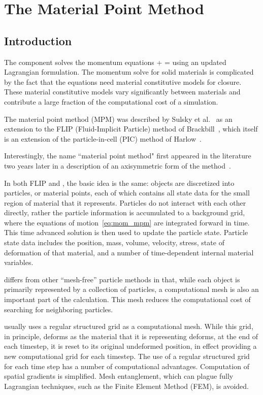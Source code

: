 \chapter{The Material Point Method} \label{ch:MPMTheory}

\section{Introduction}
The \MPM component solves the momentum equations
\Beq \label{eq:mom_mpm}
  \Div{\Bsig} + \rho\Bb = \rho\dot{\Bv} 
\Eeq
using an updated Lagrangian formulation. The momentum solve for solid materials is
complicated by the fact that the equations need material constitutive models for
closure.  These material constitutive models vary significantly between materials
and contribute a large fraction of the computational cost of a simulation.

The material point method (MPM) was described by Sulsky et al.~\cite{Sulsky1994,Sulsky1995} as
an extension to the FLIP (Fluid-Implicit Particle) method of
Brackbill~\cite{brackbill-ruppel86}, which itself is an
extension of the particle-in-cell (PIC) method of
Harlow~\cite{harlow1963}.
\begin{NoteBox}
Interestingly, the name ``material point method"
first appeared in the literature two years later in a description of
an axisymmetric form of the method~\cite{sulsky_axisym_1996}.
\end{NoteBox}
In both FLIP and \MPM, the basic idea is the same: objects are discretized into
particles, or material points, each of which contains all state data for the
small region of material that it represents.  Particles do not interact
with each other directly, rather the particle information is accumulated
to a background grid, where the equations of motion~\eqref{eq:mom_mpm} are
integrated forward in time. This time advanced solution is then used to update
the particle state.  Particle state data includes the position, mass, volume,
velocity, stress, state of deformation of that material, and a number of
time-dependent internal material variables.
\begin{NoteBox}
\MPM differs from other ``mesh-free'' particle methods in that, while each object
is primarily represented by a collection of particles, a computational mesh
is also an important part of the calculation.  This mesh reduces the computational
cost of searching for neighboring particles.
\end{NoteBox}

\MPM usually uses a regular structured grid as a computational mesh.
While this grid, in principle, deforms as the material that it is representing
deforms, at the end of each timestep, it is reset to its original undeformed
position, in effect providing a new computational grid for each timestep.
The use of a regular structured grid for each time step has a number of
computational advantages.  Computation of spatial gradients is simplified.
Mesh entanglement, which can plague fully Lagrangian techniques, such as
the Finite Element Method (FEM), is avoided.

